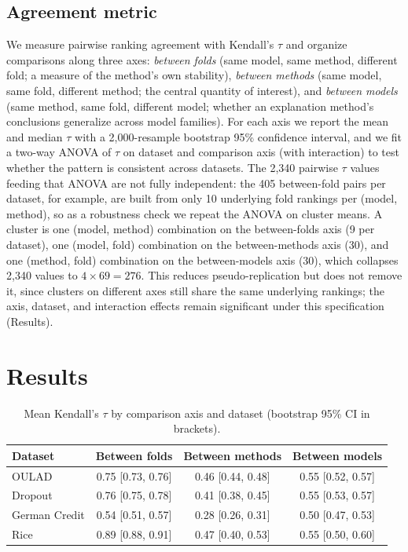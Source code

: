 \documentclass[11pt,twoside,a4paper]{article}
\begin{document}
\subsection{Agreement metric}
We measure pairwise ranking agreement with Kendall's $\tau$ and organize comparisons along three axes: \emph{between folds} (same model, same method, different fold; a measure of the method's own stability), \emph{between methods} (same model, same fold, different method; the central quantity of interest), and \emph{between models} (same method, same fold, different model; whether an explanation method's conclusions generalize across model families). For each axis we report the mean and median $\tau$ with a 2{,}000-resample bootstrap 95\% confidence interval, and we fit a two-way ANOVA of $\tau$ on dataset and comparison axis (with interaction) to test whether the pattern is consistent across datasets. The 2{,}340 pairwise $\tau$ values feeding that ANOVA are not fully independent: the 405 between-fold pairs per dataset, for example, are built from only 10 underlying fold rankings per (model, method), so as a robustness check we repeat the ANOVA on cluster means. A cluster is one (model, method) combination on the between-folds axis (9 per dataset), one (model, fold) combination on the between-methods axis (30), and one (method, fold) combination on the between-models axis (30), which collapses 2{,}340 values to $4 \times 69 = 276$. This reduces pseudo-replication but does not remove it, since clusters on different axes still share the same underlying rankings; the axis, dataset, and interaction effects remain significant under this specification (Results).

\section{Results}

\begin{table}[h]
\centering
\caption{Mean Kendall's $\tau$ by comparison axis and dataset (bootstrap 95\% CI in brackets).}
\label{tab:tau-summary}
\begin{tabular}{lccc}
\toprule
Dataset & Between folds & Between methods & Between models \\
\midrule
OULAD          & 0.75 [0.73, 0.76] & 0.46 [0.44, 0.48] & 0.55 [0.52, 0.57] \\
Dropout        & 0.76 [0.75, 0.78] & 0.41 [0.38, 0.45] & 0.55 [0.53, 0.57] \\
German Credit  & 0.54 [0.51, 0.57] & 0.28 [0.26, 0.31] & 0.50 [0.47, 0.53] \\
Rice           & 0.89 [0.88, 0.91] & 0.47 [0.40, 0.53] & 0.55 [0.50, 0.60] \\
\bottomrule
\end{tabular}
\end{table}
\end{document}
